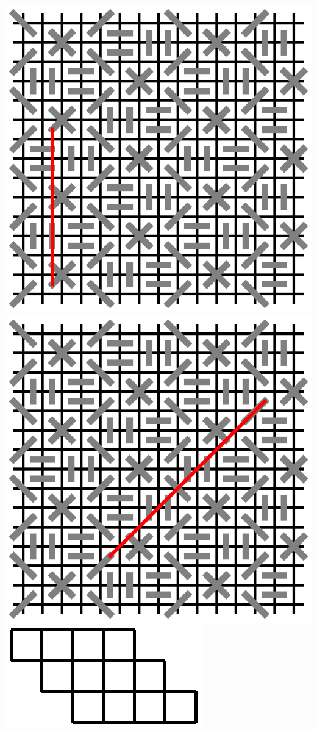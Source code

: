 \documentclass{article}
\begin{document}
\includegraphics{m-n-9-horizon.eps}
\\
\includegraphics{m-n-9-vertical.eps}
\\
\includegraphics{m-n-8-little.eps}
\end{document}
